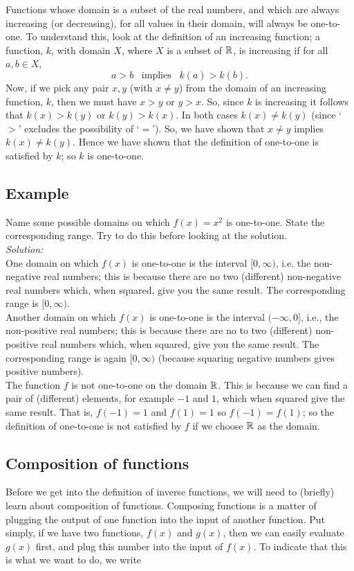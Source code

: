 \noindent Functions whose domain is a subset of the real numbers, and which are always increasing (or decreasing), for all values in their domain, will always be one-to-one. To understand this, look at the definition of an increasing function; a function, $k$, with domain $X$, where $X$ is a subset of $\mathbb{R}$, is increasing if for all $a,b \in X$,
\[
a > b \;\;\; \text{implies} \;\;\; k(a) > k(b).  
\]
Now, if we pick any pair $x,y$ (with $x \neq y$) from the domain of an increasing function, $k$, then we must have $x > y$ or $y > x$. So, since $k$ is increasing it follows that $k(x) > k(y)$ or $k(y) > k(x)$. In both cases $k(x) \neq k(y)$ (since `$>$' excludes the possibility of `$=$'). So, we have shown that $x \neq y$ implies $k(x) \neq k(y)$. Hence we have shown that the definition of one-to-one is satisfied by $k$; so $k$ is one-to-one.

\subsection{Example}
Name some possible domains on which $f(x) = x^2$ is one-to-one. State the corresponding range. Try to do this before looking at the solution. \\

\noindent \textit{Solution:} \\
\noindent One domain on which $f(x)$ is one-to-one is the interval $[0,\infty)$, i.e. the non-negative real numbers; this is because there are no two (different) non-negative real numbers which, when squared, give you the same result. The corresponding range is $[0,\infty)$. \\

\noindent Another domain on which $f(x)$ is one-to-one is the interval $(-\infty,0]$, i.e., the non-positive real numbers; this is because there are no to two (different) non-positive real numbers which, when squared, give you the same result. The corresponding range is again $[0,\infty)$ (because squaring negative numbers gives positive numbers). \\

\noindent The function $f$ is not one-to-one on the domain $\mathbb{R}$. This is because we can find a pair of (different) elements, for example $-1$ and $1$, which when squared give the same result. That is, $f(-1) = 1$ and $f(1) = 1$ so $f(-1) = f(1)$; so the definition of one-to-one is not satisfied by $f$ if we choose $\mathbb{R}$ as the domain.

\subsection{Composition of functions} \label{composition (of functions)}
Before we get into the definition of inverse functions, we will need to (briefly) learn about composition of functions. Composing functions is a matter of plugging the output of one function into the input of another function. Put simply, if we have two functions, $f(x)$ and $g(x)$, then we can easily evaluate $g(x)$ first, and plug this number into the input of $f(x)$. To indicate that this is what we want to do, we write


